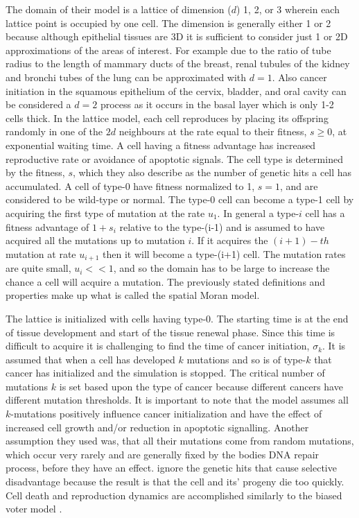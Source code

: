 \documentclass[\main/thesis.tex]{subfiles}
\begin{document}
The domain of their model is a lattice of dimension ($d$) 1, 2, or 3 wherein each lattice point is occupied by one cell. The dimension is generally either 1 or 2 because although epithelial tissues are 3D it is sufficient to consider just 1 or 2D approximations of the areas of interest. For example due to the ratio of tube radius to the length of mammary ducts of the breast, renal tubules of the kidney and bronchi tubes of the lung can be approximated with $d{=}1$. Also cancer initiation in the squamous epithelium of the cervix, bladder, and oral cavity can be considered a $d {=} 2$ process as it occurs in the basal layer which is only 1-2 cells thick. In the lattice model, each cell reproduces by placing its offspring randomly in one of the $2d$ neighbours at the rate equal to their fitness, $s {\ge} 0$, at exponential waiting time. A cell having a fitness advantage has increased reproductive rate or avoidance of apoptotic signals. The cell type is determined by the fitness, $s$, which they also describe as the number of genetic hits a cell has accumulated. A cell of type-0 have fitness normalized to 1, $s {=} 1$, and are considered to be wild-type or normal. The type-0 cell can become a type-1 cell by acquiring the first type of mutation at the rate $u_1$. In general a type-$i$ cell has a fitness advantage of $1 + s_i$ relative to the type-(i-1) and is assumed to have acquired all the mutations up to mutation $i$. If it acquires the $(i+1)-th$ mutation at rate $u_{i{+}1}$ then it will become a type-(i+1) cell. The mutation rates are quite small, $u_i << 1$, and so the domain has to be large to increase the chance a cell will acquire a mutation. The previously stated definitions and properties make up what is called the spatial Moran model. 

The lattice is initialized with cells having type-0. The starting time is at the end of tissue development and start of the tissue renewal phase. Since this time is difficult to acquire it is challenging to find the time of cancer initiation, $\sigma_k$. It is assumed that when a cell has developed $k$ mutations and so is of type-$k$ that cancer has initialized and the simulation is stopped. The critical number of mutations $k$ is set based upon the type of cancer because different cancers have different mutation thresholds. It is important to note that the model assumes all $k$-mutations positively influence cancer initialization and have the effect of increased cell growth and/or reduction in apoptotic signalling. Another assumption they used was, that all their mutations come from random mutations, which occur very rarely and are generally fixed by the bodies DNA repair process, before they have an effect. \textcite{Foo} ignore the genetic hits that cause selective disadvantage because the result is that the cell and its' progeny die too quickly. Cell death and reproduction dynamics are accomplished similarly to the biased voter model \cite{Liggett}. 
\end{document}
